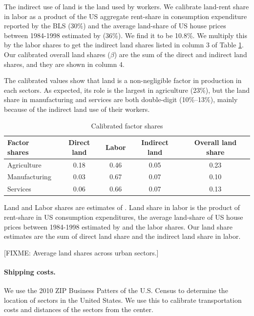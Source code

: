 \documentclass[12pt]{article}
\begin{document}
The indirect use of land is the land used by workers. We calibrate land-rent share in labor as a product of the US aggregate rent-share in consumption expenditure reported by the BLS ($30\%$) and the average land-share of US house prices between 1984-1998 estimated by  (36\%). We find it to be 10.8\%. We multiply this by the labor shares to get the indirect land shares listed in column 3 of Table \ref{tab:Sector_Shares}. Our calibrated overall land shares ($\beta$) are the sum of the direct and indirect land shares, and they are shown in column 4.

The calibrated values show that land is a non-negligible factor in production in each sectors. As expected, its role is the largest in agriculture (23\%), but the land share in manufacturing and services are both double-digit (10\%--13\%), mainly because of the indirect land use of their workers.


\begin{table}[h!]
\caption{Calibrated factor shares\label{tab:Sector_Shares}}
\begin{center}
\begin{tabular}{l|ccc|c}
\toprule
Factor shares & Direct land & Labor & Indirect land & Overall land share \\
\midrule
Agriculture & 0.18 & 0.46  & 0.05 & 0.23 \\
Manufacturing& 0.03 & 0.67 & 0.07 & 0.10  \\
Services    &  0.06 & 0.66 & 0.07 & 0.13 \\
\bottomrule
\end{tabular}
\end{center}

\noindent \footnotesize{Land and Labor shares are estimates of . Land share in labor is the product of rent-share in US consumption expenditures, the average land-share of US house prices between 1984-1998 estimated by  and the labor shares. Our land share estimates are the sum of direct land share and the indirect land share in labor.}
\end{table}

[FIXME: Average land shares across urban sectors.]

\paragraph{Shipping costs.}
We use the 2010 ZIP Business Patters of the U.S. Census \cite{CBP} to determine the location of sectors in the United States. We use this to calibrate transportation costs and distances of the sectors from the center.
\end{document}
